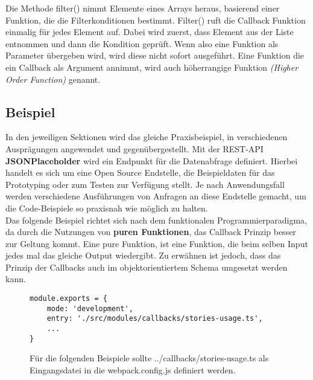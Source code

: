 \noindent
Die Methode filter() nimmt Elemente eines Arrays heraus, basierend einer Funktion, die die Filterkonditionen bestimmt. Filter() ruft die Callback Funktion einmalig für jedes Element auf. Dabei wird zuerst, dass Element aus der Liste entnommen und dann die Kondition geprüft. Wenn also eine Funktion als Parameter übergeben wird, wird diese nicht sofort ausgeführt. Eine Funktion die ein Callback als Argument annimmt, wird auch höherrangige Funktion \textit{(Higher Order Function)} genannt\cite{callbacks-example}.

\subsection{Beispiel}
In den jeweiligen Sektionen wird das gleiche Praxisbeispiel, in verschiedenen Ausprägungen angewendet und gegenübergestellt. Mit der REST-API \textbf{JSONPlaceholder} wird ein Endpunkt für die Datenabfrage definiert. Hierbei handelt es sich um eine Open Source Endstelle, die Beispieldaten für das Prototyping oder zum Testen zur Verfügung stellt. Je nach Anwendungsfall werden verschiedene Ausführungen von Anfragen an diese Endstelle gemacht, um die Code-Beispiele so praxisnah wie möglich zu halten.\\

\noindent
Das folgende Beispiel richtet sich nach dem funktionalen Programmierparadigma, da durch die Nutzungen von \textbf{puren Funktionen}, das Callback Prinzip besser zur Geltung kommt. Eine pure Funktion, ist eine Funktion, die beim selben Input jedes mal das gleiche Output wiedergibt. Zu erwähnen ist jedoch, dass das Prinzip der Callbacks auch im objektorientiertem Schema umgesetzt werden kann. 

\begin{figure}[H]
\begin{lstlisting}[basicstyle=\small]
module.exports = {
    mode: 'development',
    entry: './src/modules/callbacks/stories-usage.ts',
    ...
}
\end{lstlisting}
\caption{Für die folgenden Beispiele sollte ../callbacks/stories-usage.ts als Eingangsdatei in die webpack.config.js definiert werden.}
\end{figure}


